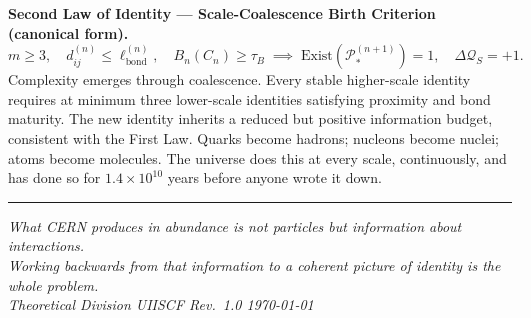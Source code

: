 \documentclass[11pt,a4paper]{article}
\newcommand{\Pid}{\mathscr{P}}
\newcommand{\Quota}{\mathcal{Q}}
\newcommand{\lbond}{\ell_{\mathrm{bond}}}
\begin{document}
\begin{smlaw}
\textbf{Second Law of Identity --- Scale-Coalescence Birth Criterion (canonical form).}
\[
  m \geq 3,\quad
  d_{ij}^{(n)} \leq \lbond^{(n)},\quad
  B_n\!\left(C_n\right) \geq \tau_B
  \;\implies\;
  \mathrm{Exist}\!\left(\Pid_*^{(n+1)}\right) = 1,\quad
  \Delta\Quota_S = +1 .
\]
Complexity emerges through coalescence.  Every stable higher-scale identity
requires at minimum three lower-scale identities satisfying proximity and
bond maturity.  The new identity inherits a reduced but positive information
budget, consistent with the First Law.  Quarks become hadrons; nucleons become
nuclei; atoms become molecules.  The universe does this at every scale,
continuously, and has done so for $1.4 \times 10^{10}$ years before anyone
wrote it down.
\end{smlaw}

\vspace{2em}
\noindent\rule{\textwidth}{0.6pt}

\begin{center}
\small\textit{%
  What CERN produces in abundance is not particles but information about
  interactions.\\[3pt]
  Working backwards from that information to a coherent picture of identity
  is the whole problem.\\[4pt]
  Theoretical Division \quad\textbar\quad
  UIISCF Rev.~1.0 \quad\textbar\quad \today
}
\end{center}
\end{document}
